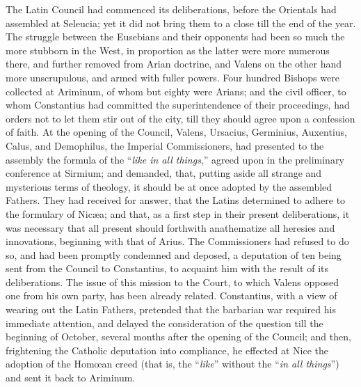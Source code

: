The Latin Council had commenced its deliberations, before the
Orientals had assembled at Seleucia; yet it did not bring them to a
close till the end of the year. The struggle between the Eusebians and
their opponents had been so much the more stubborn in the West, in
proportion as the latter were more numerous there, and further removed
from Arian doctrine, and Valens on the other hand more unscrupulous,
and armed with fuller powers. Four hundred Bishops were collected at
Ariminum, of whom but eighty were Arians; and the civil officer, to
whom Constantius had committed the superintendence of their
proceedings, had orders not to let them stir out of the city, till
they should agree upon a confession of faith. At the opening of the
Council, Valens, Ursacius, Germinius, Auxentius, Calus, and Demophilus,
the Imperial Commissioners, had presented to the assembly the formula
of the ``\emph{like in all things},'' agreed upon in the
preliminary conference at Sirmium; and demanded, that, putting aside
all strange and mysterious terms of theology, it should be at once
adopted by the assembled Fathers. They had received for answer, that
the Latins determined to adhere to the formulary of Nicæa; and that,
as a first step in their present deliberations, it was necessary that
all present should forthwith anathematize all heresies and
innovations, beginning with that of Arius. The Commissioners had
refused to do so, and had been promptly condemned and deposed, a
deputation of ten being sent from the Council to Constantius, to
acquaint him with the result of its deliberations. The issue of this
mission to the Court, to which Valens opposed one from his own party,
has been already related. Constantius, with a view of wearing
out the Latin Fathers, pretended that the barbarian war required his
immediate attention, and delayed the consideration of the question
till the beginning of October, several months after the opening of the
Council; and then, frightening the Catholic deputation into
compliance, he effected at Nice the adoption of the Homœan creed
(that is, the ``\emph{like}'' without the ``\emph{in all
things}'') and sent it back to Ariminum.

